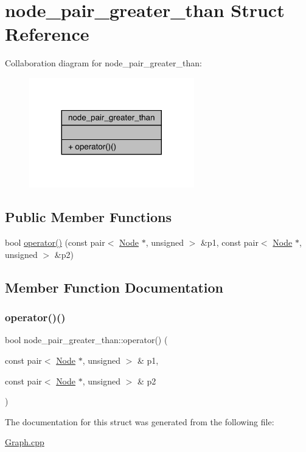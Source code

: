 \hypertarget{structnode__pair__greater__than}{}\section{node\+\_\+pair\+\_\+greater\+\_\+than Struct Reference}
\label{structnode__pair__greater__than}


Collaboration diagram for node\+\_\+pair\+\_\+greater\+\_\+than\+:
\nopagebreak
\begin{figure}[H]
\begin{center}
\leavevmode
\includegraphics[width=203pt]{structnode__pair__greater__than__coll__graph}
\end{center}
\end{figure}
\subsection*{Public Member Functions}
\begin{DoxyCompactItemize}
\item 
bool \hyperlink{structnode__pair__greater__than_aefc537db2afdf9b3b89469adaaeea00b}{operator()} (const pair$<$ \hyperlink{class_node}{Node} $\ast$, unsigned $>$ \&p1, const pair$<$ \hyperlink{class_node}{Node} $\ast$, unsigned $>$ \&p2)
\end{DoxyCompactItemize}


\subsection{Member Function Documentation}
\hypertarget{structnode__pair__greater__than_aefc537db2afdf9b3b89469adaaeea00b}{}\label{structnode__pair__greater__than_aefc537db2afdf9b3b89469adaaeea00b} 
\subsubsection{\texorpdfstring{operator()()}{operator()()}}
{\footnotesize\ttfamily bool node\+\_\+pair\+\_\+greater\+\_\+than\+::operator() (\begin{DoxyParamCaption}\item[{const pair$<$ \hyperlink{class_node}{Node} $\ast$, unsigned $>$ \&}]{p1,  }\item[{const pair$<$ \hyperlink{class_node}{Node} $\ast$, unsigned $>$ \&}]{p2 }\end{DoxyParamCaption})\hspace{0.3cm}{\ttfamily [inline]}}



The documentation for this struct was generated from the following file\+:\begin{DoxyCompactItemize}
\item 
\hyperlink{_graph_8cpp}{Graph.\+cpp}\end{DoxyCompactItemize}
